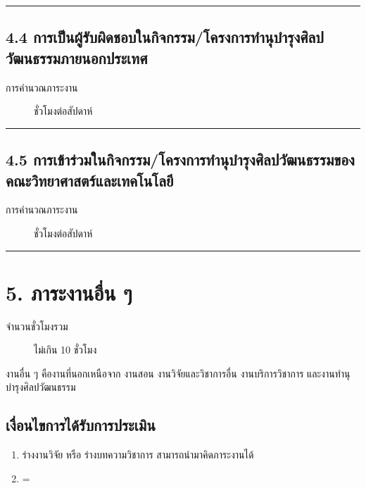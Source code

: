 \documentclass[a4paper,12pt,english]{sphinxmanual}
\begin{document}
\bigskip\hrule\bigskip



\section{4.4 การเป็นผู้รับผิดชอบในกิจกรรม/โครงการทำนุบำรุงศิลปวัฒนธรรมภายนอกประเทศ}
\label{\detokenize{4culture:id11}}\label{\detokenize{4culture:id12}}\begin{description}
\item[{การคำนวณภาระงาน}]  ชั่วโมงต่อสัปดาห์

\end{description}


\bigskip\hrule\bigskip



\section{4.5 การเข้าร่วมในกิจกรรม/โครงการทำนุบำรุงศิลปวัฒนธรรมของคณะวิทยาศาสตร์และเทคโนโลยี}
\label{\detokenize{4culture:id13}}\label{\detokenize{4culture:id14}}\begin{description}
\item[{การคำนวณภาระงาน}]  ชั่วโมงต่อสัปดาห์

\end{description}


\bigskip\hrule\bigskip



\chapter{5. ภาระงานอื่น ๆ}
\label{\detokenize{5etc:id1}}\label{\detokenize{5etc::doc}}\begin{description}
\item[{จำนวนชั่วโมงรวม}] \leavevmode
ไม่เกิน 10 ชั่วโมง

\end{description}

งานอื่น ๆ คืองานที่นอกเหนือจาก งานสอน งานวิจัยและวิชาการอื่น งานบริการวิชาการ และงานทำนุบำรุงศิลปวัฒนธรรม


\section{เงื่อนไขการได้รับการประเมิน}
\label{\detokenize{5etc:id2}}\begin{enumerate}
%
\item {} 
ร่างงานวิจัย หรือ ร่างบทความวิชาการ  สามารถนำมาคิดภาระงานได้

\item {} 
=

\end{enumerate}
\end{document}

